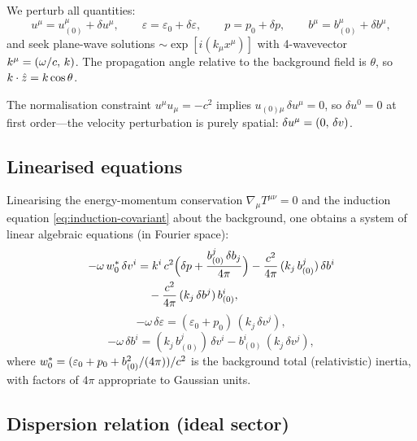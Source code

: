 We perturb all quantities:
\begin{equation}
  u^{\mu} = u^{\mu}_{(0)} + \delta u^{\mu},
  \qquad
  \varepsilon = \varepsilon_{0} + \delta\varepsilon,
  \qquad
  p = p_{0} + \delta p,
  \qquad
  b^{\mu} = b^{\mu}_{(0)} + \delta b^{\mu},
  \label{eq:perturbation-ansatz}
\end{equation}
and seek plane-wave solutions $\sim \exp[i(k_{\mu}x^{\mu})]$ with
4-wavevector $k^{\mu} = (\omega/c,\,k)$.  The propagation angle
relative to the background field is $\theta$, so
$k\cdot\hat{z} = k\cos\theta$.

The normalisation constraint $u^{\mu}u_{\mu}=-c^{2}$ implies
$u_{(0)\mu}\,\delta u^{\mu} = 0$, so $\delta u^{0}=0$ at first order---the
velocity perturbation is purely spatial: $\delta u^{\mu} = (0,\,\delta v)$.

\subsection{Linearised equations}

Linearising the energy-momentum conservation $\nabla_{\mu}T^{\mu\nu}=0$
and the induction equation \eqref{eq:induction-covariant} about the
background, one obtains a system of linear algebraic equations (in
Fourier space):
\begin{align}
  -\omega\,w^{\ast}_{0}\,\delta v^{i}
  &= k^{i}\,c^{2}\Bigl(\delta p + \frac{b_{(0)}^{j}\,\delta b_{j}}{4\pi}\Bigr)
  - \frac{c^{2}}{4\pi}\,(k_{j}\,b_{(0)}^{j})\,\delta b^{i}
  \notag\\
  &\quad
  - \frac{c^{2}}{4\pi}\,(k_{j}\,\delta b^{j})\,b_{(0)}^{i},
  \label{eq:mhd-lin-momentum}
\end{align}
\begin{equation}
  -\omega\,\delta\varepsilon
  = (\varepsilon_{0}+p_{0})\,(k_{j}\,\delta v^{j}),
  \label{eq:mhd-lin-energy}
\end{equation}
\begin{equation}
  -\omega\,\delta b^{i}
  = (k_{j}\,b_{(0)}^{j})\,\delta v^{i}
  - b_{(0)}^{i}\,(k_{j}\,\delta v^{j}),
  \label{eq:lin-induction}
\end{equation}
where $w^{\ast}_{0} = (\varepsilon_{0}+p_{0}+b_{(0)}^{2}/(4\pi))/c^{2}$
is the background total (relativistic) inertia, with factors
of $4\pi$ appropriate to Gaussian units.

\subsection{Dispersion relation (ideal sector)}

